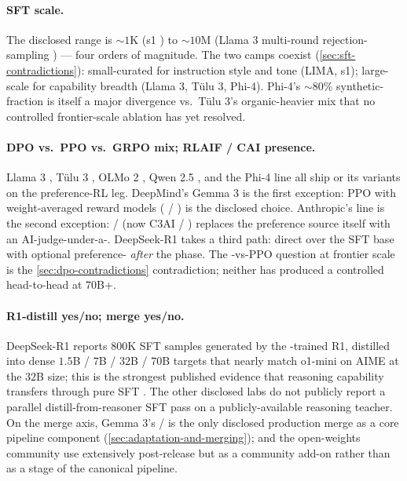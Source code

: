 \paragraph{SFT scale.}
The disclosed range is $\sim\!1$K (s1 \citep{s1-2025}) to $\sim 10$M
(Llama 3 multi-round rejection-sampling \citep{meta-llama3}) --- four
orders of magnitude. The two camps coexist (\cref{sec:sft-contradictions}):
small-curated for instruction style and tone (LIMA, s1); large-scale
for capability breadth (Llama 3, Tülu 3, Phi-4). Phi-4's $\sim\!80\%$
synthetic-fraction \citep[\S 1]{phi4} is itself a major
divergence vs.\ Tülu 3's organic-heavier mix \citep{tulu3} that no
controlled frontier-scale ablation has yet resolved.

\paragraph{DPO vs.\ PPO vs.\ GRPO mix; RLAIF / CAI presence.}
Llama 3 \citep{meta-llama3}, Tülu 3 \citep{tulu3}, OLMo 2
\citep{olmo2}, Qwen 2.5 \citep{qwen2-5}, and the Phi-4 line
\citep{phi4} all ship  \citep{rafailov2023-dpo} or its variants
on the preference-RL leg. DeepMind's Gemma 3 \citep{gemma3} is the
first exception: PPO with weight-averaged reward models
( \citep{warm-2024} /  \citep{warp-2024}) is the disclosed
choice. Anthropic's  line is the second exception:  / 
\citep{bai2022-cai} (now C3AI \citep{c3ai-2025} / 
\citep{r-cai-2026}) replaces the preference source itself with an
AI-judge-under-a-. DeepSeek-R1 takes a third path:
direct  over the SFT base \citep{deepseek-r1} with optional
preference- \emph{after} the  phase. The -vs-PPO question at
frontier scale is the \cref{sec:dpo-contradictions} contradiction;
neither has produced a controlled head-to-head at $70$B+.

\paragraph{R1-distill yes/no; merge yes/no.}
DeepSeek-R1 \citep{deepseek-r1} reports $800$K SFT samples generated
by the -trained R1, distilled into dense $1.5$B / $7$B / $32$B /
$70$B targets that nearly match o1-mini on AIME at the $32$B size;
this is the strongest published evidence that reasoning capability
transfers through pure SFT \citep[\S 4]{deepseek-r1}. The other
disclosed labs do not publicly report a parallel distill-from-reasoner
SFT pass on a publicly-available reasoning teacher. On the merge axis,
Gemma 3's / \citep{warm-2024,warp-2024} is the only disclosed
production merge as a core pipeline component
(\cref{sec:adaptation-and-merging});  and the open-weights
community use  \citep{mergekit2024} extensively post-release
but as a community add-on rather than as a stage of the canonical
pipeline.

